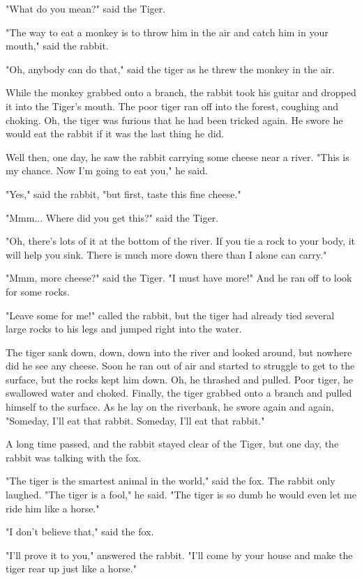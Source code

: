 "What do you mean?" said the Tiger.

"The way to eat a monkey is to throw him in the air and catch him in your mouth," said the rabbit.

"Oh, anybody can do that," said the tiger as he threw the monkey in the air.

While the monkey grabbed onto a branch, the rabbit took his guitar and dropped it into the Tiger's mouth. The poor tiger ran off into the forest, coughing and choking. Oh, the tiger was furious that he had been tricked again. He swore he would eat the rabbit if it was the last thing he did.

Well then, one day, he saw the rabbit carrying some cheese near a river. "This is my chance. Now I'm going to eat you," he said.

"Yes," said the rabbit, "but first, taste this fine cheese."

"Mmm... Where did you get this?" said the Tiger.

"Oh, there's lots of it at the bottom of the river. If you tie a rock to your body, it will help you sink. There is much more down there than I alone can carry."

"Mmm, more cheese?" said the Tiger. "I must have more!" And he ran off to look for some rocks.

"Leave some for me!" called the rabbit, but the tiger had already tied several large rocks to his legs and jumped right into the water.

The tiger sank down, down, down into the river and looked around, but nowhere did he see any cheese. Soon he ran out of air and started to struggle to get to the surface, but the rocks kept him down. Oh, he thrashed and pulled. Poor tiger, he swallowed water and choked. Finally, the tiger grabbed onto a branch and pulled himself to the surface. As he lay on the riverbank, he swore again and again, "Someday, I'll eat that rabbit. Someday, I'll eat that rabbit."

A long time passed, and the rabbit stayed clear of the Tiger, but one day, the rabbit was talking with the fox.

"The tiger is the smartest animal in the world," said the fox. The rabbit only laughed. "The tiger is a fool," he said. "The tiger is so dumb he would even let me ride him like a horse."

"I don't believe that," said the fox.

"I'll prove it to you," answered the rabbit. "I'll come by your house and make the tiger rear up just like a horse."

